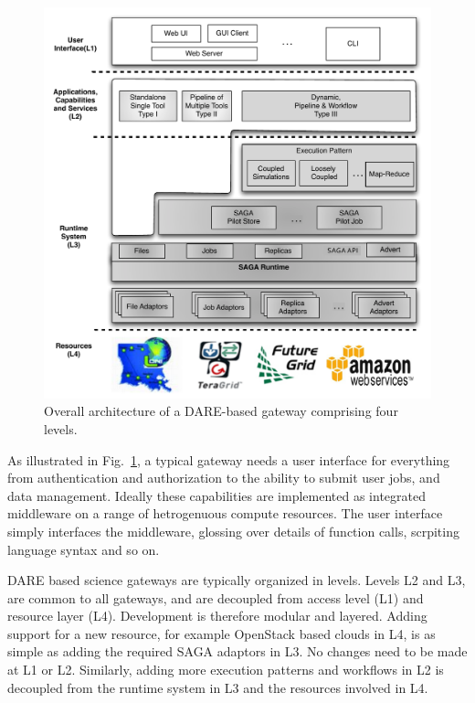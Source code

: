 \documentclass[]{svjour3}
\begin{document}
\begin{figure}
 \centering
 \includegraphics[scale=0.55]{figures/DARE-gateway-arch.pdf}
 \caption{\small {} Overall architecture of a
 DARE-based gateway comprising four levels. 
 }
 \label{fig:dare-arch} 
\end{figure}


As illustrated in Fig.~\ref{fig:dare-arch}, a typical gateway needs a
user interface for everything from authentication and authorization
to the ability to submit user jobs, and data management. 
Ideally these capabilities are implemented as integrated middleware on
a range of hetrogenuous compute resources. The user interface simply
interfaces the middleware, glossing over details of function calls,
scrpiting language syntax and so on.

DARE based science gateways are typically organized in levels.
Levels L2 and L3, are common to all gateways, and are decoupled from
access level (L1) and resource layer (L4). Development is therefore
modular and layered. Adding support for a new resource, for example
OpenStack based clouds in L4, is as simple as adding the required SAGA
adaptors in L3. No changes need to be made at L1 or L2. Similarly,
adding more execution patterns and workflows in L2 is decoupled
from the runtime system in L3 and the resources involved in L4.
\end{document}
